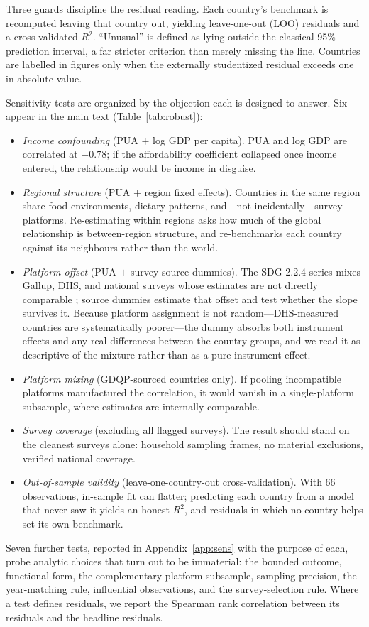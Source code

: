 \documentclass[11pt]{article}
\begin{document}
Three guards discipline the residual reading. Each country's benchmark is recomputed leaving that country out, yielding leave-one-out (LOO) residuals and a cross-validated $R^2$. ``Unusual'' is defined as lying outside the classical 95\% prediction interval, a far stricter criterion than merely missing the line. Countries are labelled in figures only when the externally studentized residual exceeds one in absolute value.

Sensitivity tests are organized by the objection each is designed to answer. Six appear in the main text (Table~\ref{tab:robust}):
\begin{itemize}
\item \emph{Income confounding} (PUA $+$ log GDP per capita). PUA and log GDP are correlated at $-0.78$; if the affordability coefficient collapsed once income entered, the relationship would be income in disguise.
\item \emph{Regional structure} (PUA $+$ region fixed effects). Countries in the same region share food environments, dietary patterns, and---not incidentally---survey platforms. Re-estimating within regions asks how much of the global relationship is between-region structure, and re-benchmarks each country against its neighbours rather than the world.
\item \emph{Platform offset} (PUA $+$ survey-source dummies). The SDG 2.2.4 series mixes Gallup, DHS, and national surveys whose estimates are not directly comparable \citep{hanleycook2025}; source dummies estimate that offset and test whether the slope survives it. Because platform assignment is not random---DHS-measured countries are systematically poorer---the dummy absorbs both instrument effects and any real differences between the country groups, and we read it as descriptive of the mixture rather than as a pure instrument effect.
\item \emph{Platform mixing} (GDQP-sourced countries only). If pooling incompatible platforms manufactured the correlation, it would vanish in a single-platform subsample, where estimates are internally comparable.
\item \emph{Survey coverage} (excluding all flagged surveys). The result should stand on the cleanest surveys alone: household sampling frames, no material exclusions, verified national coverage.
\item \emph{Out-of-sample validity} (leave-one-country-out cross-validation). With 66 observations, in-sample fit can flatter; predicting each country from a model that never saw it yields an honest $R^2$, and residuals in which no country helps set its own benchmark.
\end{itemize}
Seven further tests, reported in Appendix~\ref{app:sens} with the purpose of each, probe analytic choices that turn out to be immaterial: the bounded outcome, functional form, the complementary platform subsample, sampling precision, the year-matching rule, influential observations, and the survey-selection rule. Where a test defines residuals, we report the Spearman rank correlation between its residuals and the headline residuals.
\end{document}
